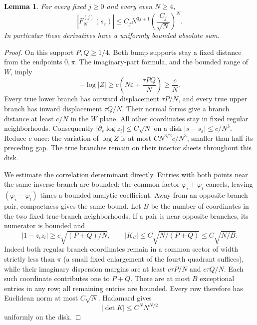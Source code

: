 \documentclass[11pt]{article}
\numberwithin{equation}{section}
\newtheorem{lemma}[theorem]{Lemma}
\theoremstyle{remark}\newtheorem{remark}[theorem]{Remark}
\begin{document}
\begin{lemma}\label{lem:constrained-selected}
For every fixed $j\ge0$ and every even $N\ge4$,
\[
 |F_N^{(j)}(s_\varepsilon)|
    \le C_j N^{3j+1}\left(\frac{C_j}{\sqrt N}\right)^N.
\]
In particular these derivatives have a uniformly bounded absolute sum.
\end{lemma}
\begin{proof}
On this support $P,Q\ge1/4$.  Both bump supports stay a fixed
distance from the endpoints $0,\pi$.  The imaginary-part formula,
and the bounded range of $W$, imply
\[
 -\log|Z|\ge c\left(N\varepsilon+\frac{\tau PQ}{N}\right)
             \ge \frac cN.
\]
Every true lower branch has outward displacement $\tau P/N$,
and every true upper branch has inward displacement $\tau Q/N$.
Their normal forms give a branch distance at least $c/N$ in
the $W$ plane.  All other coordinates stay in fixed regular
neighborhoods.  Consequently $|\partial_s\log z_i|\le C\sqrt N$
on a disk $|s-s_\varepsilon|\le c/N^3$.  Reduce $c$ once: the
variation of $\log Z$ is at most $CN^{3/2}c/N^3$, smaller than
half its preceding gap.  The true branches remain on their interior
sheets throughout this disk.

We estimate the correlation determinant directly.
Entries with both points near the same inverse branch are bounded:
the common factor $\varphi_i+\varphi_l$ cancels, leaving
$(\varphi_i-\varphi_l)$ times a bounded analytic coefficient.
Away from an opposite-branch pair, compactness gives the same bound.
Let $B$ be the number of coordinates in the two fixed true-branch
neighborhoods.  If a pair is near opposite branches, its numerator
is bounded and
\[
 |1-z_i z_l|\ge c\sqrt{(P+Q)/N},\qquad
 |K_{il}|\le C\sqrt{N/(P+Q)}\le C\sqrt{N/B}.
\]
Indeed both regular branch coordinates remain in a common sector
of width strictly less than $\pi$ (a small fixed enlargement of the
fourth quadrant suffices), while their imaginary dispersion margins are
at least $c\tau P/N$ and $c\tau Q/N$.  Each such coordinate
contributes one to $P+Q$.  There are at most $B$ exceptional
entries in any row; all remaining entries are bounded.  Every row
therefore has Euclidean norm at most $C\sqrt N$.  Hadamard gives
\[
 |\det K|\le C^N N^{N/2}
\]
uniformly on the disk.


\end{proof}
\end{document}
